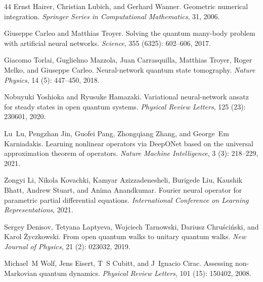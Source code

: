 \documentclass[11pt]{article}
\begin{document}
\begin{thebibliography}{44}
Ernst Hairer, Christian Lubich, and Gerhard Wanner.
\newblock Geometric numerical integration.
\newblock \emph{Springer Series in Computational Mathematics}, 31, 2006.

Giuseppe Carleo and Matthias Troyer.
\newblock Solving the quantum many-body problem with artificial neural
  networks.
\newblock \emph{Science}, 355 (6325): 602--606, 2017.

Giacomo Torlai, Guglielmo Mazzola, Juan Carrasquilla, Matthias Troyer, Roger
  Melko, and Giuseppe Carleo.
\newblock Neural-network quantum state tomography.
\newblock \emph{Nature Physics}, 14 (5): 447--450, 2018.

Nobuyuki Yoshioka and Ryusuke Hamazaki.
\newblock Variational neural-network ansatz for steady states in open quantum
  systems.
\newblock \emph{Physical Review Letters}, 125 (23): 230601,
  2020.

Lu~Lu, Pengzhan Jin, Guofei Pang, Zhongqiang Zhang, and George~Em Karniadakis.
\newblock Learning nonlinear operators via {DeepONet} based on the universal
  approximation theorem of operators.
\newblock \emph{Nature Machine Intelligence}, 3 (3):
  218--229, 2021.

Zongyi Li, Nikola Kovachki, Kamyar Azizzadenesheli, Burigede Liu, Kaushik
  Bhatt, Andrew Stuart, and Anima Anandkumar.
\newblock Fourier neural operator for parametric partial differential
  equations.
\newblock \emph{International Conference on Learning Representations}, 2021.

Sergey Denisov, Tetyana Laptyeva, Wojciech Tarnowski, Dariusz
  Chru{\'s}ci{\'n}ski, and Karol {\.Z}yczkowski.
\newblock From open quantum walks to unitary quantum walks.
\newblock \emph{New Journal of Physics}, 21 (2): 023032,
  2019.

Michael~M Wolf, Jens Eisert, T~S Cubitt, and J~Ignacio Cirac.
\newblock Assessing non-{Markovian} quantum dynamics.
\newblock \emph{Physical Review Letters}, 101 (15): 150402,
  2008.


\end{thebibliography}
\end{document}

